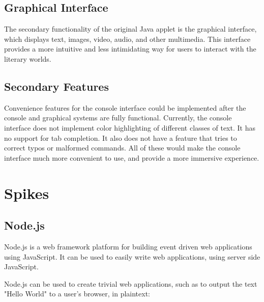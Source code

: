 \documentclass[12pt, letterpaper]{report}
\begin{document}
	\section{Graphical Interface}
	The secondary functionality of the original Java applet is the graphical interface, which displays text, images, video, audio, and other multimedia. This interface provides a more intuitive and less intimidating way for users to interact with the literary worlds. 
	
	\section{Secondary Features}
	Convenience features for the console interface could be implemented after the console and graphical systems are fully functional. Currently, the console interface does not implement color highlighting of different classes of text. It has no support for tab completion. It also does not have a feature that tries to correct typos or malformed commands. All of these would make the console interface much more convenient to use, and provide a more immersive experience.
	
	\par
	
	
	
	\chapter{Spikes}
	\section{Node.js}
	

	
	\par
	Node.js is a web framework platform for building event driven web applications using JavaScript. It can be used to easily write web applications, using server side JavaScript.
    	
	\par
    Node.js can be used to create trivial web applications, such as to output the text "Hello World" to a user's browser, in plaintext:
    
\end{document}
